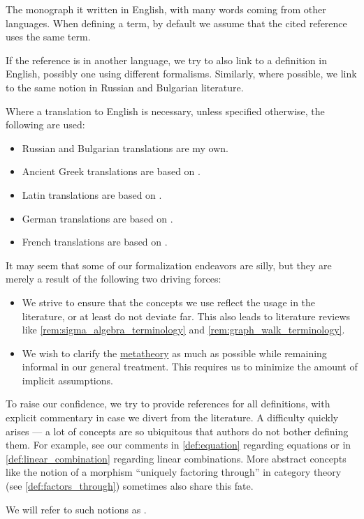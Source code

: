 \begin{remark}\label{rem:monograph_languages}
  The monograph it written in English, with many words coming from other languages. When defining a term, by default we assume that the cited reference uses the same term.

  If the reference is in another language, we try to also link to a definition in English, possibly one using different formalisms. Similarly, where possible, we link to the same notion in Russian and Bulgarian literature.

  Where a translation to English is necessary, unless specified otherwise, the following are used:
  \begin{itemize}
    \item Russian and Bulgarian translations are my own.
    \item Ancient Greek translations are based on \cite{DiggleEtAl2021CambridgeGreekLexicon}.
    \item Latin translations are based on \cite{Bello2013OriginsOfMathematicalWords}.
    \item German translations are based on \cite{Hyman1960GermanEnglishMathematicsDictionary}.
    \item French translations are based on \cite{Bacaër2026LexiqueMathématiqueAnglaisFrançais}.
  \end{itemize}
\end{remark}

\begin{concept}\label{con:assumed_knowledge}
  It may seem that some of our formalization endeavors are silly, but they are merely a result of the following two driving forces:
  \begin{itemize}
    \item We strive to ensure that the concepts we use reflect the usage in the literature, or at least do not deviate far. This also leads to literature reviews like \cref{rem:sigma_algebra_terminology} and \cref{rem:graph_walk_terminology}.

    \item We wish to clarify the \hyperref[con:metalogic]{metatheory} as much as possible while remaining informal in our general treatment. This requires us to minimize the amount of implicit assumptions.
  \end{itemize}

  To raise our confidence, we try to provide references for all definitions, with explicit commentary in case we divert from the literature. A difficulty quickly arises --- a lot of concepts are so ubiquitous that authors do not bother defining them. For example, see our comments in \cref{def:equation} regarding equations or in \cref{def:linear_combination} regarding linear combinations. More abstract concepts like the notion of a morphism \enquote{uniquely factoring through} in category theory (see \cref{def:factors_through}) sometimes also share this fate.

  We will refer to such notions as .
\end{concept}
